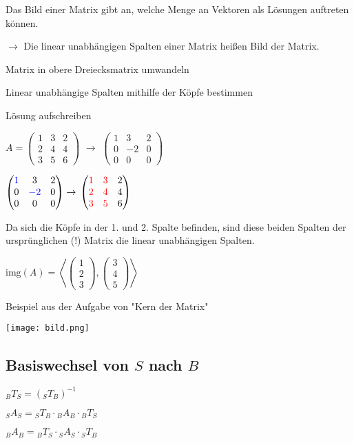 \begin{multicols*}{3}
    {Das Bild einer Matrix gibt an, welche Menge an Vektoren als Lösungen auftreten können.}

    {$\to$ Die linear unabhängigen Spalten einer Matrix heißen Bild der Matrix.}



    { Matrix in obere Dreiecksmatrix umwandeln}

    { Linear unabhängige Spalten mithilfe der Köpfe bestimmen}

    { Lösung aufschreiben}

    {$A =  \begin{pmatrix} 1 & 3 & 2 \\ 2 & 4 & 4 \\ 3 & 5 & 6 \end{pmatrix}$   {$\to$ $\begin{pmatrix} 1 & 3 & 2 \\ 0 & -2 & 0 \\ 0 & 0 & 0 \end{pmatrix}$}}

    { $\begin{pmatrix} {\color{blue}1} & 3 & 2 \\ 0 & {\color{blue}-2} & 0 \\ 0 & 0 & 0 \end{pmatrix} \rightarrow$   $\begin{pmatrix} {\color{red}1} & {\color{red}3} & 2 \\ {\color{red}2} & {\color{red}4} & 4 \\ {\color{red}3} & {\color{red}5} & 6 \end{pmatrix}$}

    {Da sich die Köpfe in der 1. und 2. Spalte befinden, sind diese beiden Spalten der ursprünglichen (!) Matrix die linear unabhängigen Spalten.}



    { $\text{img}(A) = \left\langle \begin{pmatrix} 1 \\ 2 \\ 3 \end{pmatrix}, \begin{pmatrix} 3 \\ 4 \\ 5 \end{pmatrix} \right\rangle$}

    Beispiel aus der Aufgabe von "Kern der Matrix"

    {\texttt{[image: bild.png]}}

    \subsection{Basiswechsel von $S$ nach $B$}

    ${}_{B}T_{S} = ({}_{S}T_{B})^{-1}$

    ${}_{S}A_{S} = {}_{S}T_{B} \cdot {}_{B}A_{B} \cdot {}_{B}T_{S}$

    ${}_{B}A_{B} = {}_{B}T_{S}  \cdot {}_{S}A_{S} \cdot {}_{S}T_{B}$



\end{multicols*}





